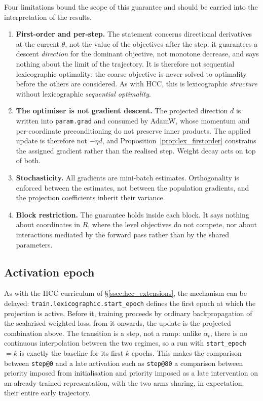 Four limitations bound the scope of this guarantee and should be carried into the interpretation
of the results.

\begin{enumerate}
    \item \textbf{First-order and per-step.} The statement concerns directional derivatives at the
    current $\theta$, not the value of the objectives after the step: it guarantees a descent
    \emph{direction} for the dominant objective, not monotone decrease, and says nothing about the
    limit of the trajectory. It is therefore not sequential lexicographic optimality: the coarse
    objective is never solved to optimality before the others are considered. As with HCC, this is
    lexicographic \emph{structure} without lexicographic \emph{sequential optimality}.
    \item \textbf{The optimiser is not gradient descent.} The projected direction $d$ is written
    into \texttt{param.grad} and consumed by AdamW, whose momentum and per-coordinate
    preconditioning do not preserve inner products. The applied update is therefore not $-\eta d$,
    and Proposition~\ref{prop:lex_firstorder} constrains the assigned gradient rather than the
    realised step. Weight decay acts on top of both.
    \item \textbf{Stochasticity.} All gradients are mini-batch estimates. Orthogonality is enforced
    between the estimates, not between the population gradients, and the projection coefficients
    inherit their variance.
    \item \textbf{Block restriction.} The guarantee holds inside each block. It says nothing about
    coordinates in $R$, where the level objectives do not compete, nor about interactions mediated
    by the forward pass rather than by the shared parameters.
\end{enumerate}

\subsection{Activation epoch}
\label{ssec:lex_activation}

As with the HCC curriculum of \S\ref{ssec:hcc_extensions}, the mechanism can be delayed:
\texttt{train.lexicographic.start\_epoch} defines the first epoch at which the projection is
active. Before it, training proceeds by ordinary backpropagation of the scalarised weighted loss;
from it onwards, the update is the projected combination above. The transition is a step, not a
ramp: unlike $\alpha_t$, there is no continuous interpolation between the two regimes, so a run
with \texttt{start\_epoch} $=k$ is exactly the baseline for its first $k$ epochs. This makes the
comparison between \texttt{step@0} and a late activation such as \texttt{step@80} a comparison
between priority imposed from initialisation and priority imposed as a late intervention on an
already-trained representation, with the two arms sharing, in expectation, their entire early
trajectory.

